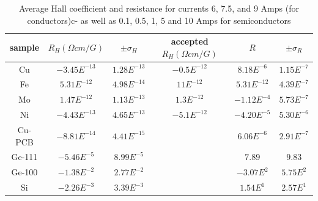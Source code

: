 \documentclass[a4paper,12pt,english]{all-in-one} %
\begin{document}
\begin{table}[]
\centering
\begin{tabular}{c|c|c|c|c|c}
sample & $R_H ({\Omega} cm/G)$  &  $\pm \sigma_{H}$ & accepted $R_H ({\Omega}cm/G)$ & $R$ & $\pm \sigma_{R}$ \\ \hline

Cu & $-3.45E^{-13}$ & $1.28E^{-13}$ & $-0.5E^{-12}$ & $8.18E^{-6}$ & $1.15E^{-7}$ \\
Fe & $5.31E^{-12}$ & $4.98E^{-14}$ & $11E^{-12}$ & $5.31E^{-12}$ & $4.39E^{-7}$ \\
Mo & $1.47E^{-12}$ & $1.13E^{-13}$ & $1.3E^{-12}$ & $-1.12E^{-4}$ & $5.73E^{-7}$ \\
Ni & $-4.43E^{-13}$ & $4.65E^{-13}$ & $-5.1E^{-12}$ & $-4.20E^{-5}$ & $5.30E^{-6}$ \\
Cu-PCB & $-8.81E^{-14}$ & $4.41E^{-15}$ & & $6.06E^{-6}$ & $2.91E^{-7}$ \\
Ge-111 & $-5.46E^{-5}$ & $8.99E^{-5}$ & & $7.89$ & $9.83$ \\
Ge-100 & $-1.38E^{-2}$ & $2.77E^{-2}$ & &  $-3.07E^{2}$ & $5.75E^{2}$ \\
Si & $-2.26E^{-3}$ & $3.39E^{-3}$ & & $1.54E^{1}$ & $2.57E^{1}$ \\
\end{tabular}
\caption{Average Hall coefficient and resistance for currents 6, 7.5, and 9 Amps (for conductors)c- as well as 0.1, 0.5, 1, 5 and 10 Amps for semiconductors}
\label{tab:hall_hv_resis}
\end{table}
\end{document}
